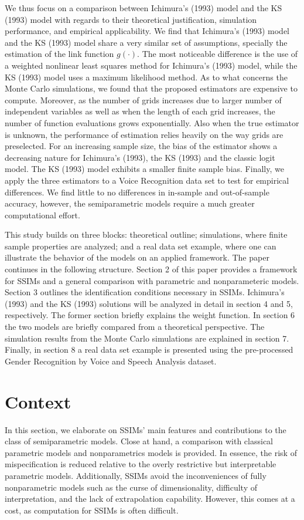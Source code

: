 We thus focus on a comparison between Ichimura's (1993) \cite{[6]} model and the KS (1993) \cite{[12]} model with regards to their theoretical justification, simulation performance, and empirical applicability. We find that Ichimura's (1993) \cite{[6]} model and the KS (1993) \cite{[12]} model share a very similar set of assumptions, specially the estimation of the link function $g(\cdot)$. The most noticeable difference is the use of a weighted nonlinear least squares method for Ichimura's (1993) \cite{[6]} model, while the KS (1993) \cite{[12]} model uses a maximum likelihood method. As to what concerns the Monte Carlo simulations, we found that the proposed estimators are expensive to compute. Moreover, as the number of grids increases due to larger number of independent variables as well as when the length of each grid increases, the number of function evaluations grows exponentially. Also when the true estimator is unknown, the performance of estimation relies heavily on the way grids are preselected. For an increasing sample size, the bias of the estimator shows a decreasing nature for Ichimura's (1993)\cite{[12]}, the KS (1993) and the classic logit model. The KS (1993) \cite{[12]} model exhibits a smaller finite sample bias. Finally, we apply the three estimators to a Voice Recognition data set to test for empirical differences. We find little to no differences in in-sample and out-of-sample accuracy, however, the semiparametric models require a much greater computational effort. 

This study builds on three blocks: theoretical outline; simulations, where finite sample properties are analyzed; and a real data set example, where one can illustrate the behavior of the models on an applied framework. 
The paper continues in the following structure. Section 2 of this paper provides a framework for SSIMs and a general comparison with parametric and nonparameteric models. Section 3 outlines the identification conditions necessary in SSIMs. Ichimura's (1993) \cite{[6]} and the KS (1993) \cite{[12]} solutions will be analyzed in detail in section 4 and 5, respectively. The former section briefly explains the weight function. In section 6 the two models are briefly compared from a theoretical perspective. The simulation results from the Monte Carlo simulations are explained in section 7. Finally, in section 8 a real data set example is presented using the pre-processed Gender Recognition by Voice and Speech Analysis dataset.

\section{Context} %
\label{sec:context}
In this section, we elaborate on SSIMs' main features and contributions to the class of semiparametric models. Close at hand, a comparison with classical parametric models and nonparametrics models is provided. In essence, the risk of mispecification is reduced relative to the overly restrictive but interpretable parametric models. Additionally, SSIMs avoid the inconveniences of fully nonparametric models such as the curse of dimensionality, difficulty of interpretation, and the lack of extrapolation capability. However, this comes at a cost, as computation for SSIMs is often difficult.

